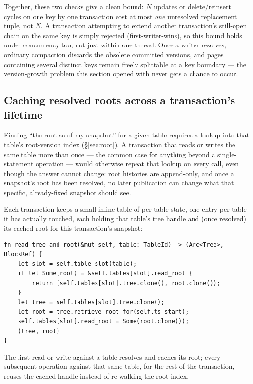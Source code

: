 \documentclass[11pt]{article}
\begin{document}
Together, these two checks give a clean bound: $N$ updates or delete/reinsert
cycles on one key by one transaction cost at most \emph{one} unresolved replacement
tuple, not $N$. A transaction attempting to extend another transaction's still-open
chain on the same key is simply rejected (first-writer-wins), so this bound holds
under concurrency too, not just within one thread. Once a writer resolves, ordinary
compaction discards the obsolete committed versions, and pages containing several
distinct keys remain freely splittable at a key boundary --- the version-growth
problem this section opened with never gets a chance to occur.

\subsection{Caching resolved roots across a transaction's lifetime}
\label{sec:rootcache}

Finding ``the root as of my snapshot'' for a given table requires a lookup into that
table's root-version index (\S\ref{sec:root}). A transaction that reads or writes the
same table more than once --- the common case for anything beyond a single-statement
operation --- would otherwise repeat that lookup on every call, even though the
answer cannot change: root histories are append-only, and once a snapshot's root has
been resolved, no later publication can change what that specific, already-fixed
snapshot should see.

Each transaction keeps a small inline table of per-table state, one entry per table
it has actually touched, each holding that table's tree handle and (once resolved)
its cached root for this transaction's snapshot:

\begin{lstlisting}
fn read_tree_and_root(&mut self, table: TableId) -> (Arc<Tree>, BlockRef) {
    let slot = self.table_slot(table);
    if let Some(root) = &self.tables[slot].read_root {
        return (self.tables[slot].tree.clone(), root.clone());
    }
    let tree = self.tables[slot].tree.clone();
    let root = tree.retrieve_root_for(self.ts_start);
    self.tables[slot].read_root = Some(root.clone());
    (tree, root)
}
\end{lstlisting}

The first read or write against a table resolves and caches its root; every
subsequent operation against that same table, for the rest of the transaction, reuses
the cached handle instead of re-walking the root index.
\end{document}

